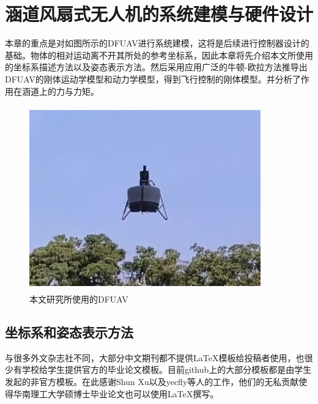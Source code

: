 \chapter{涵道风扇式无人机的系统建模与硬件设计}

本章的重点是对如图所示的DFUAV进行系统建模，这将是后续进行控制器设计的基础。物体的相对运动离不开其所处的参考坐标系，因此本章将先介绍本文所使用的坐标系描述方法以及姿态表示方法。然后采用应用广泛的牛顿-欧拉方法推导出DFUAV的刚体运动学模型和动力学模型，得到飞行控制的刚体模型。并分析了作用在涵道上的力与力矩。%
\begin{figure}[htbp]
	\centering
	\begin{minipage}[c]{1\textwidth} %
		\centering
		\includegraphics[width=10cm,height=8cm]{Fig/DFUAV.jpg}
		\caption{\label{DFUAV}本文研究所使用的DFUAV}
	\end{minipage}%
\end{figure}

\section{坐标系和姿态表示方法}


与很多外文杂志社不同，大部分中文期刊都不提供\LaTeX{}模板给投稿者使用，也很少有学校给学生提供官方的毕业论文模板。目前github上的大部分模板都是由学生发起的非官方模板。在此感谢Shun Xu以及yecfly等人的工作，他们的无私贡献使得华南理工大学硕博士毕业论文也可以使用\LaTeX{}撰写。


